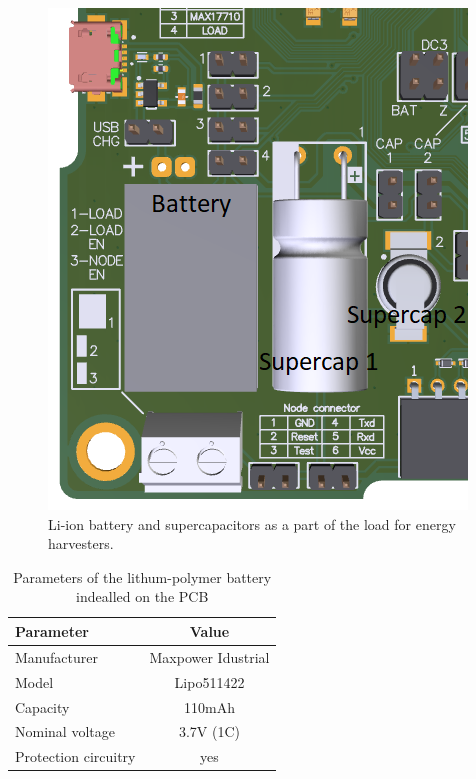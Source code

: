 \documentclass[12pt,a4paper]{article}
\begin{document}
\begin{figure}[ht!]
\includegraphics[scale=0.6]{batteryload.png}
\caption{Li-ion battery and supercapacitors as a part of the load for energy harvesters.}
\label{fig:batteryload}
\end{figure} 

\begin{table}[ht!]
\begin{tabular}{|l|c|}
\hline
\textbf{Parameter}              & \textbf{Value} \\ \hline
Manufacturer & Maxpower Idustrial          \\ \hline
Model                 & Lipo511422        \\ \hline
Capacity                & 110mAh         \\ \hline
Nominal voltage     & 3.7V (1C)            \\ \hline
Protection circuitry     & yes           \\ \hline
\end{tabular}
\caption{Parameters of the lithum-polymer battery indealled on the PCB \cite{battery_params} }
\label{tab:battery}
\end{table}
\end{document}
